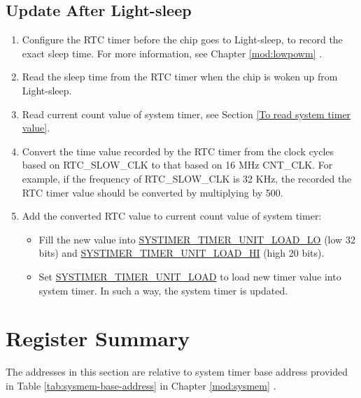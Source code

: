 \documentclass[main\_\_EN.tex]{subfiles}
\begin{document}
\subsection{Update After Light-sleep}
\begin{enumerate}
    \item Configure the RTC timer before the chip goes to Light-sleep, to record the exact sleep time. For more information, see Chapter \ref{mod:lowpowm} \textit{}.
    \item Read the sleep time from the RTC timer when the chip is woken up from Light-sleep.
    \item Read current count value of system timer, see Section \ref{To read system timer value}.
    \item Convert the time value recorded by the RTC timer from the clock cycles based on RTC\_SLOW\_CLK to that based on 16 MHz CNT\_CLK. For example, if the frequency of RTC\_SLOW\_CLK is 32 KHz, the recorded the RTC timer value should be converted by multiplying by 500.
    \item Add the converted RTC value to current count value of system timer:
    \begin{itemize}
        \item Fill the new value into \hyperref[fielddesc:SYSTIMERTIMERUNIT0LOADLO]{SYSTIMER\_TIMER\_UNIT\_LOAD\_LO} (low 32 bits) and \hyperref[fielddesc:SYSTIMERTIMERUNIT0LOADHI]{SYSTIMER\_TIMER\_UNIT\_LOAD\_HI} (high 20 bits).
        \item Set \hyperref[fielddesc:SYSTIMERTIMERUNIT0LOAD]{SYSTIMER\_TIMER\_UNIT\_LOAD} to load new timer value into system timer. In such a way, the system timer is updated.    \end{itemize}
\end{enumerate}





\hypertarget{systimer-reg-summ}{}
\section{Register Summary}
\label{sec:systimer-reg-summ}

The addresses in this section are relative to system timer base address provided in Table \ref{tab:sysmem-base-address} in Chapter \ref{mod:sysmem} \textit{}.
\end{document}
